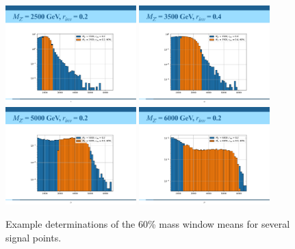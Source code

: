 \begin{figure}[!htbp]
\centering
   \includegraphics[width=0.45\textwidth]{figures/stats/mass60percent_ex1}
   \includegraphics[width=0.45\textwidth]{figures/stats/mass60percent_ex2}
   \includegraphics[width=0.45\textwidth]{figures/stats/mass60percent_ex4}
   \includegraphics[width=0.45\textwidth]{figures/stats/mass60percent_ex3}
    \caption{Example determinations of the 60\% mass window means for several signal points.
    \label{fig:mass60percent_ex}}
\end{figure}

